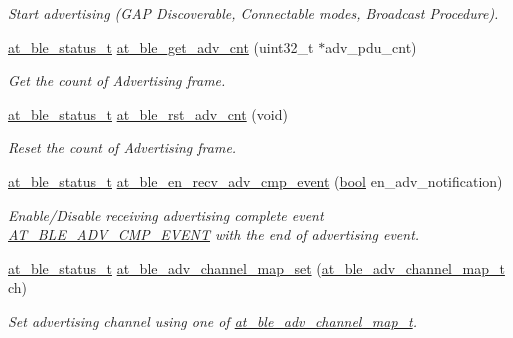 \begin{DoxyCompactItemize}
\begin{DoxyCompactList}\small\item\em Start advertising (G\+AP Discoverable, Connectable modes, Broadcast Procedure). \end{DoxyCompactList}\item 
\mbox{\hyperlink{group__error__codes__group_ga3b1db9b95feb157b3c188ca27fe76988}{at\+\_\+ble\+\_\+status\+\_\+t}} \mbox{\hyperlink{group__gap__adv__group_ga989a6f7ad4b5ec22583a2c4f13afc925}{at\+\_\+ble\+\_\+get\+\_\+adv\+\_\+cnt}} (uint32\+\_\+t $\ast$adv\+\_\+pdu\+\_\+cnt)
\begin{DoxyCompactList}\small\item\em Get the count of Advertising frame. \end{DoxyCompactList}\item 
\mbox{\hyperlink{group__error__codes__group_ga3b1db9b95feb157b3c188ca27fe76988}{at\+\_\+ble\+\_\+status\+\_\+t}} \mbox{\hyperlink{group__gap__adv__group_ga79cce7e0365a099993a4b05dedafa523}{at\+\_\+ble\+\_\+rst\+\_\+adv\+\_\+cnt}} (void)
\begin{DoxyCompactList}\small\item\em Reset the count of Advertising frame. \end{DoxyCompactList}\item 
\mbox{\hyperlink{group__error__codes__group_ga3b1db9b95feb157b3c188ca27fe76988}{at\+\_\+ble\+\_\+status\+\_\+t}} \mbox{\hyperlink{group__gap__adv__group_gadcd0d72189caecac9bc807d9378d33b0}{at\+\_\+ble\+\_\+en\+\_\+recv\+\_\+adv\+\_\+cmp\+\_\+event}} (\mbox{\hyperlink{group__group__sam0__utils_ga97a80ca1602ebf2303258971a2c938e2}{bool}} en\+\_\+adv\+\_\+notification)
\begin{DoxyCompactList}\small\item\em Enable/\+Disable receiving advertising complete event \mbox{\hyperlink{at__ble__api_8h_a3324640b95f33169515f89738ed5baebac6e92e8f99a08c49a27007c2e32124f9}{A\+T\+\_\+\+B\+L\+E\+\_\+\+A\+D\+V\+\_\+\+C\+M\+P\+\_\+\+E\+V\+E\+NT}} with the end of advertising event. \end{DoxyCompactList}\item 
\mbox{\hyperlink{group__error__codes__group_ga3b1db9b95feb157b3c188ca27fe76988}{at\+\_\+ble\+\_\+status\+\_\+t}} \mbox{\hyperlink{group__gap__adv__group_gae3a980a5bd00c7f06ca00a752ef2769b}{at\+\_\+ble\+\_\+adv\+\_\+channel\+\_\+map\+\_\+set}} (\mbox{\hyperlink{at__ble__api_8h_ae3d53ccdbeba291d4765432f6a9d33ca}{at\+\_\+ble\+\_\+adv\+\_\+channel\+\_\+map\+\_\+t}} ch)
\begin{DoxyCompactList}\small\item\em Set advertising channel using one of \mbox{\hyperlink{at__ble__api_8h_ae3d53ccdbeba291d4765432f6a9d33ca}{at\+\_\+ble\+\_\+adv\+\_\+channel\+\_\+map\+\_\+t}}. \end{DoxyCompactList}\item 

\end{DoxyCompactItemize}
